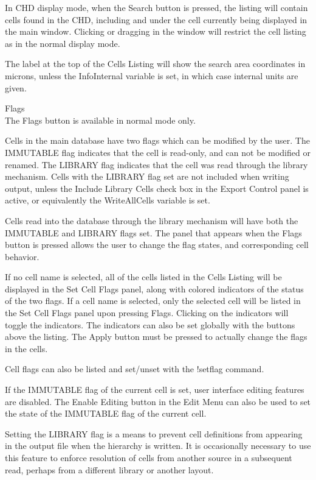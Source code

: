 \begin{description}
In CHD display mode, when the {\cb Search} button is pressed, the
listing will contain cells found in the CHD, including and under the
cell currently being displayed in the main window.  Clicking or
dragging in the window will restrict the cell listing as in the normal
display mode.

The label at the top of the {\cb Cells Listing} will show the search
area coordinates in microns, unless the {\et InfoInternal} variable is
set, in which case internal units are given.

\item{\cb Flags}\\
The {\cb Flags} button is available in normal mode only.

Cells in the main database have two flags which can be modified by the
user.  The IMMUTABLE flag indicates that the cell is read-only, and
can not be modified or renamed.  The LIBRARY flag indicates that the
cell was read through the library mechanism.  Cells with the LIBRARY
flag set are not included when writing output, unless the {\cb Include
Library Cells} check box in the {\cb Export Control} panel is
active, or equivalently the {\et WriteAllCells} variable is set.

Cells read into the database through the library mechanism will have
both the IMMUTABLE and LIBRARY flags set.  The panel that appears when
the {\cb Flags} button is pressed allows the user to change the flag
states, and corresponding cell behavior.

If no cell name is selected, all of the cells listed in the {\cb Cells
Listing} will be displayed in the {\cb Set Cell Flags} panel, along
with colored indicators of the status of the two flags.  If a cell
name is selected, only the selected cell will be listed in the {\cb
Set Cell Flags} panel upon pressing {\cb Flags}.  Clicking on the
indicators will toggle the indicators.  The indicators can also be set
globally with the buttons above the listing.  The {\cb Apply} button
must be pressed to actually change the flags in the cells.

Cell flags can also be listed and set/unset with the {\cb !setflag}
command.

If the IMMUTABLE flag of the current cell is set, user interface
editing features are disabled.  The {\cb Enable Editing} button in the
{\cb Edit Menu} can also be used to set the state of the IMMUTABLE
flag of the current cell.

Setting the LIBRARY flag is a means to prevent cell definitions from
appearing in the output file when the hierarchy is written.  It is
occasionally necessary to use this feature to enforce resolution of
cells from another source in a subsequent read, perhaps from a
different library or another layout.


\end{description}
